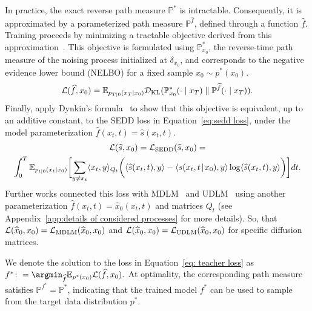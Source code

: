         In practice, the exact reverse path measure $\mathbb{P}^*$ is intractable. Consequently, it is approximated by a parameterized path measure $\mathbb{P}^{\widehat{f}}$, defined through a function $\widehat{f}$.
Training proceeds by minimizing a tractable objective derived from this approximation~\citep{campbell2022continuous, song2021maximum, lou2024discrete}.
This objective is formulated using $\mathbb{P}^*_{x_0}$, the reverse-time path measure of the noising process initialized at $\delta_{x_0}$, and corresponds to the negative evidence lower bound (NELBO) for a fixed sample $x_0 \sim p^*(x_0)$.
        \begin{equation}
        \label{eq: teacher loss}
            \mathcal{L}(\widehat{f}, x_0) = \mathbb{E}_{p_{T\mid 0}(x_T \mid x_0)} \mathcal{D}_{\text{KL}}(\mathbb{P}^*_{x_0} (\cdot \mid x_T) \parallel \mathbb{P}^{\widehat{f}}(\cdot \mid x_T)).
        \end{equation}
        Finally, \citet{lou2024discrete} apply Dynkin’s formula~\citep{hanson2007applied, campbell2022continuous} to show that this objective is equivalent, up to an additive constant, to the SEDD loss in Equation~\eqref{eq:sedd loss}, under the model parameterization $\widehat{f}(x_t, t) = \widehat{s}(x_t, t)$.
        \begin{gather}
            \mathcal{L}(\widehat{s}, x_0)=\mathcal{L}_{\text{SEDD}}(\widehat{s}, x_0) = \nonumber \\ \int_0^T \mathbb{E}_{p_{t|0}(x_t|x_0)} \biggl[\sum_{y \neq x_t} \langle x_t, y\rangle_{Q_t} \biggl(\langle \widehat{s}(x_t,t), y\rangle -  \langle s(x_t,t \! \mid \! x_0), y\rangle \log  \langle \widehat{s}(x_t, t), y\rangle \biggr)\biggr]dt. 
        \end{gather}
        Further works connected this loss with MDLM~\citep{sahoo2024simple} and UDLM~\citep{schiff2024discreteguidance} using another parameterization $\widehat{f}(x_t, t) = \widehat{x}_0(x_t, t)$ and matrices $Q_t$ (see Appendix~\ref{app:details of considered processes} for more details). So, that $\mathcal{L}(\widehat{x}_0, x_0) = \mathcal{L}_{\text{MDLM}}(\widehat{x}_0, x_0)$ and $\mathcal{L}(\widehat{x}_0, x_0)=\mathcal{L}_{\text{UDLM}}(\widehat{x}_0, x_0)$ for specific diffusion matrices.

        We denote the solution to the loss in Equation~\eqref{eq: teacher loss} as $f^* \colon= \argmin_{\widehat{f}} \mathbb{E}_{p^*(x_0)} \LC(\widehat{f}, x_0).$ At optimality, the corresponding path measure satisfies $\mathbb{P}^{f^*} = \mathbb{P}^*$, indicating that the trained model $f^*$ can be used to sample from the target data distribution $p^*$.
        
